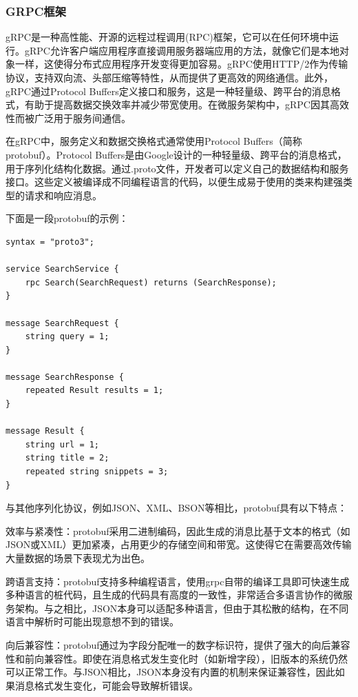 \documentclass[UTF8,a4paper,12pt]{ctexart}
\numberwithin{equation}{section}
\begin{document}
\subsubsection{GRPC框架}
gRPC是一种高性能、开源的远程过程调用(RPC)框架，它可以在任何环境中运行。gRPC允许客户端应用程序直接调用服务器端应用的方法，就像它们是本地对象一样，这使得分布式应用程序开发变得更加容易。gRPC使用HTTP/2作为传输协议，支持双向流、头部压缩等特性，从而提供了更高效的网络通信。此外，gRPC通过Protocol Buffers定义接口和服务，这是一种轻量级、跨平台的消息格式，有助于提高数据交换效率并减少带宽使用。在微服务架构中，gRPC因其高效性而被广泛用于服务间通信。\par
在gRPC中，服务定义和数据交换格式通常使用Protocol Buffers（简称protobuf）。Protocol Buffers是由Google设计的一种轻量级、跨平台的消息格式，用于序列化结构化数据。通过.proto文件，开发者可以定义自己的数据结构和服务接口。这些定义被编译成不同编程语言的代码，以便生成易于使用的类来构建强类型的请求和响应消息。\par
下面是一段protobuf的示例：
\begin{verbatim}
syntax = "proto3";

service SearchService {
	rpc Search(SearchRequest) returns (SearchResponse);
}

message SearchRequest {
	string query = 1;
}

message SearchResponse {
	repeated Result results = 1;
}

message Result {
	string url = 1;
	string title = 2;
	repeated string snippets = 3;
}
\end{verbatim}
与其他序列化协议，例如JSON、XML、BSON等相比，protobuf具有以下特点：\par
效率与紧凑性：protobuf采用二进制编码，因此生成的消息比基于文本的格式（如JSON或XML）更加紧凑，占用更少的存储空间和带宽。这使得它在需要高效传输大量数据的场景下表现尤为出色。\par
跨语言支持：protobuf支持多种编程语言，使用grpc自带的编译工具即可快速生成多种语言的桩代码，且生成的代码具有高度的一致性，非常适合多语言协作的微服务架构。与之相比，JSON本身可以适配多种语言，但由于其松散的结构，在不同语言中解析时可能出现意想不到的错误。\par
向后兼容性：protobuf通过为字段分配唯一的数字标识符，提供了强大的向后兼容性和前向兼容性。即使在消息格式发生变化时（如新增字段），旧版本的系统仍然可以正常工作。与JSON相比，JSON本身没有内置的机制来保证兼容性，因此如果消息格式发生变化，可能会导致解析错误。\par
\end{document}
